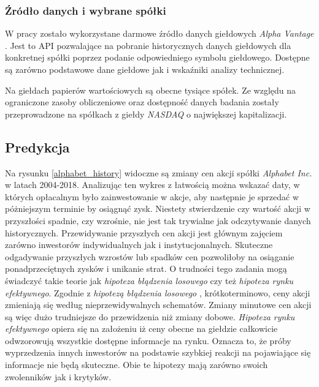 \documentclass[a4paper, twoside, 11pt, openright]{article}
\begin{document}
\subsubsection{Źródło danych i wybrane spółki}

W pracy zostało wykorzystane darmowe źródło danych giełdowych \textit{Alpha Vantage} \cite{alphavantage}. Jest to API pozwalające na pobranie historycznych danych giełdowych dla konkretnej spółki poprzez podanie odpowiedniego symbolu giełdowego. Dostępne są zarówno podstawowe dane giełdowe jak i wskaźniki analizy technicznej. 

\bigskip

Na giełdach papierów wartościowych są obecne tysiące spółek. Ze względu na ograniczone zasoby obliczeniowe oraz dostępność danych badania zostały przeprowadzone na spółkach z giełdy \textit{NASDAQ} o największej kapitalizacji.

\subsection{Predykcja}

Na rysunku \ref{alphabet_history} widoczne są zmiany cen akcji spółki \textit{Alphabet Inc.} w latach 2004-2018. Analizując ten wykres z łatwością można wskazać daty, w których opłacalnym było zainwestowanie w akcje, aby następnie je sprzedać w póżniejszym terminie by osiągnąć zysk. Niestety stwierdzenie czy wartość akcji w przyszłości spadnie, czy wzrośnie, nie jest tak trywialne jak odczytywanie danych historycznych. Przewidywanie przyszłych cen akcji jest głównym zajęciem zarówno inwestorów indywidualnych jak i instytucjonalnych. Skuteczne odgadywanie przyszłych wzrostów lub spadków cen pozwoliłoby na osiąganie ponadprzeciętnych zysków i unikanie strat. O trudności tego zadania mogą świadczyć takie teorie jak \textit{hipoteza błądzenia losowego} czy też \textit{hipoteza rynku efektywnego}. Zgodnie z \textit{hipotezą błądzenia losowego} \cite{randwalk}, krótkoterminowo, ceny akcji zmieniają się według nieprzewidywalnych schematów. Zmiany minutowe cen akcji są więc dużo trudniejsze do przewidzenia niż zmiany dobowe. \textit{Hipoteza rynku efektywnego} \cite{efficientmarket} opiera się na założeniu iż ceny obecne na giełdzie całkowicie odwzorowują wszystkie dostępne informacje na rynku. Oznacza to, że próby wyprzedzenia innych inwestorów na podstawie szybkiej reakcji na pojawiające się informacje nie będą skuteczne. Obie te hipotezy mają zarówno swoich zwolenników jak i krytyków.
\end{document}

